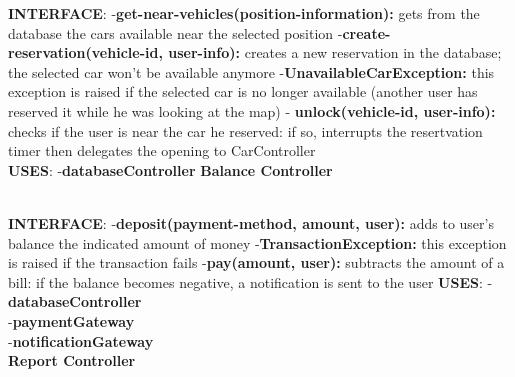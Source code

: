 \documentclass{article}
\begin{document}
\textbf{INTERFACE}: 
 \newline
-\textbf{get-near-vehicles(position-information):} gets from the database the cars available near the selected position 
\newline
-\textbf{create-reservation(vehicle-id, user-info):} creates a new reservation in the database; the selected car won't be available anymore
\newline
-\textbf{UnavailableCarException:} this exception is raised if the selected car is no longer available (another user has reserved it while he was looking at the map)  
\newline 
- \textbf{unlock(vehicle-id, user-info):} checks if the user is near the car he reserved: if so, interrupts the resertvation timer then delegates the opening to CarController
\\
\textbf{USES}:   
\newline
-\textbf{databaseController}
\newpage
\textbf{Balance Controller}\\
\begin{figure}[ht]
\end{figure}\\
\textbf{INTERFACE}: 
 \newline
-\textbf{deposit(payment-method, amount, user):} adds to user's balance the indicated amount of money
\newline
-\textbf{TransactionException:} this exception is raised if the transaction fails 
\newline
-\textbf{pay(amount, user):} subtracts the amount of a bill: if the balance becomes negative, a notification is sent to the user
\newline
\textbf{USES}:   
\newline
-\textbf{databaseController}
\\
-\textbf{paymentGateway}
\\
-\textbf{notificationGateway}
\\
\newpage
\textbf{Report Controller}\\
\begin{figure}[ht]
\end{figure}\\
\end{document}
